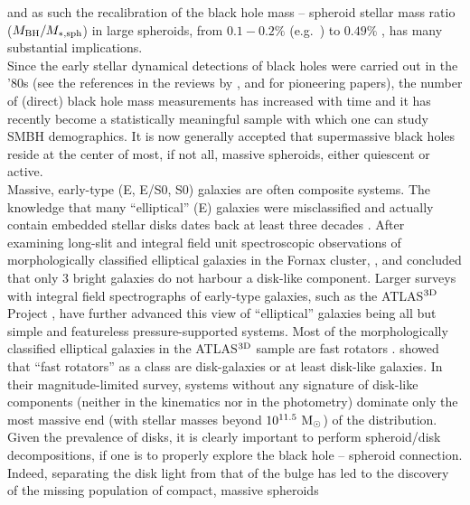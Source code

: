 \documentclass[preprint2]{emulateapj}
\begin{document}
and as such the recalibration of the black hole mass -- spheroid stellar mass ratio ($M_{\rm BH}/M_{\rm *,sph}$) in large spheroids,
from $0.1 - 0.2\%$ (e.g.~\citealt{marconihunt2003,haringrix2004}) to $0.49\%$ \citep{grahamscott2015}, 
has many substantial implications. \\
Since the early stellar dynamical detections of black holes were carried out in the '80s 
(see the references in the reviews by \citealt{kormendyrichstone1995}, \citealt{richstone1998} 
and \citealt{graham2015bulges} for pioneering papers), 
the number of (direct) black hole mass measurements has increased with time 
and it has recently become a statistically meaningful sample  
with which one can study SMBH demographics. 
It is now generally accepted that supermassive black holes reside at the center of most, if not all, 
massive spheroids, either quiescent or active. \\
Massive, early-type (E, E/S0, S0) galaxies are often composite systems. 
The knowledge that many ``elliptical'' (E) galaxies were misclassified and actually contain embedded stellar disks dates back  
at least three decades  
\citep{capaccioli1987,carter1987,rixwhite1990,rixwhite1992,bender1990,scorzabender1990,nieto1991,scorzabender1995}. 
After examining long-slit and integral field unit spectroscopic observations of morphologically classified elliptical galaxies in the Fornax cluster, 
\cite{donofrio1995}, \cite{graham1998fornax} and \cite{scott2014} concluded that only 3 bright galaxies do not harbour a disk-like component.
Larger surveys with integral field spectrographs of early-type galaxies, such as the ATLAS$^{\rm 3D}$ Project \citep{cappellari2011}, 
have further advanced this view of ``elliptical'' galaxies being all but simple and featureless pressure-supported systems.
Most of the morphologically classified elliptical galaxies in the ATLAS$^{\rm 3D}$ sample are fast rotators \citep{atlas3dIII-MNRAS}.
\cite{krajnovic2013} showed that ``fast rotators'' as a class are disk-galaxies or at least disk-like galaxies. 
In their magnitude-limited survey, systems 
without any signature of disk-like components (neither in the kinematics nor in the photometry) 
dominate only the most massive end (with stellar masses beyond $10^{11.5}~\rm M_\odot$) of the distribution. 
Given the prevalence of disks, it is clearly important to perform spheroid/disk decompositions, 
if one is to properly explore the black hole -- spheroid connection. 
Indeed, separating the disk light from that of the bulge has led to the discovery of the missing population of compact, massive spheroids 
\end{document}
